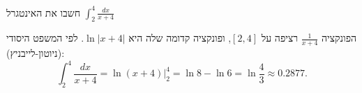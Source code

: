 
\begin{question}
חשבו את האינטגרל $\displaystyle\int_2^4\frac{dx}{x+4}$
\end{question}

\begin{solution}
הפונקציה $\frac{1}{x+4}$ רציפה על $[2,4]$, ופונקציה קדומה שלה היא $\ln|x+4|$. לפי המשפט היסודי (ניוטון-לייבניץ):
\[ \int_2^4\frac{dx}{x+4}=\ln(x+4)\Big|_2^4=\ln8-\ln6=\boxed{\ln\frac43}\approx 0.2877. \]
\end{solution}
